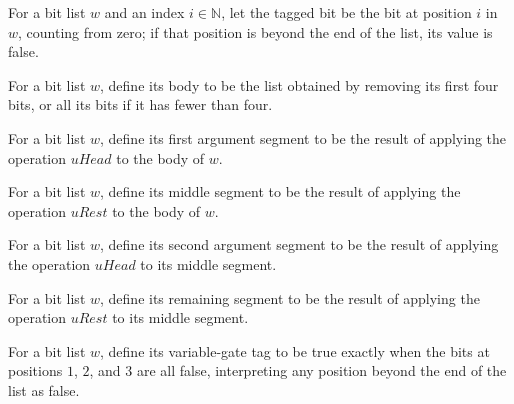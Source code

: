 \begin{definition}
\label{Randomized.PIT.tagBit}
\leanok
For a bit list $w$ and an index $i\in\mathbb{N}$, let the tagged bit be the bit at
position $i$ in $w$, counting from zero; if that position is beyond the end of the list,
its value is false.
\end{definition}

\begin{definition}
\label{Randomized.PIT.bodyW}
\leanok
For a bit list $w$, define its body to be the list obtained by removing its first four
bits, or all its bits if it has fewer than four.
\end{definition}

\begin{definition}
\label{Randomized.PIT.arg1W}
\leanok
{}
For a bit list $w$, define its first argument segment to be the result of applying the
operation $uHead$ to the body of $w$.
\end{definition}

\begin{definition}
\label{Randomized.PIT.midW}
\leanok
{}
For a bit list $w$, define its middle segment to be the result of applying the operation
$uRest$ to the body of $w$.
\end{definition}

\begin{definition}
\label{Randomized.PIT.arg2W}
\leanok
{}
For a bit list $w$, define its second argument segment to be the result of applying the
operation $uHead$ to its middle segment.
\end{definition}

\begin{definition}
\label{Randomized.PIT.rest2W}
\leanok
{}
For a bit list $w$, define its remaining segment to be the result of applying the
operation $uRest$ to its middle segment.
\end{definition}

\begin{definition}
\label{Randomized.PIT.isVarW}
\leanok
{}
For a bit list $w$, define its variable-gate tag to be true exactly when the bits at
positions $1$, $2$, and $3$ are all false, interpreting any position beyond the end of
the list as false.
\end{definition}

